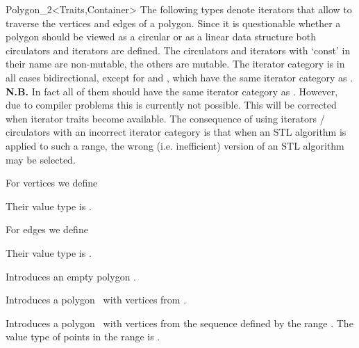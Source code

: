 \begin{ccClassTemplate}{Polygon_2<Traits,Container>}
The following types denote iterators that allow to traverse the vertices and
edges of a polygon. 
Since it is questionable whether a polygon should be viewed as a circular or 
as a linear data structure both circulators and iterators are defined.
The circulators and iterators with `const' in their name are non-mutable, the 
others are mutable.
The iterator category is in all cases bidirectional, except for
 and , which have the
same iterator category as .
{\bf N.B.} In fact all of them should have the same iterator category as
. However, due to compiler problems this is currently
not possible. This will be corrected when iterator traits become available.
The consequence of using iterators / circulators with an incorrect iterator
category is that when an STL algorithm is applied to such a range,
the wrong (i.e. inefficient) version of an STL algorithm may be selected. 

For vertices we define

\ccGlue
{}
\ccGlue
{}
\ccGlue
{}

Their value type is .

For edges we define

\ccGlue
{}

Their value type is .

\ccCreation
{}
\ccThreeToTwo

  \ccHidden{}
    { Introduces an empty polygon \ccVar.}

  \ccHidden{}
    { Introduces a polygon \ccVar\ with vertices from .}

    { Introduces a polygon \ccVar\ with vertices from the sequence defined by
      the range \ccStyle{[first,last)}.
      \ccPrecond The value type of points in the range \ccStyle{[first,last)} is
                 .
    }



\end{ccClassTemplate}
